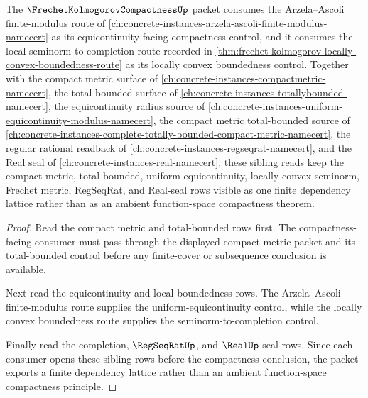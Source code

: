 \begin{theorem}
\label{thm:frechet-kolmogorov-compactness-sibling-route}
The $\FrechetKolmogorovCompactnessUp$ packet consumes the Arzela--Ascoli finite-modulus route of \autoref{ch:concrete-instances-arzela-ascoli-finite-modulus-namecert} as its equicontinuity-facing compactness control, and it consumes the local seminorm-to-completion route recorded in \autoref{thm:frechet-kolmogorov-locally-convex-boundedness-route} as its locally convex boundedness control. Together with the compact metric surface of \autoref{ch:concrete-instances-compactmetric-namecert}, the total-bounded surface of \autoref{ch:concrete-instances-totallybounded-namecert}, the equicontinuity radius source of \autoref{ch:concrete-instances-uniform-equicontinuity-modulus-namecert}, the compact metric total-bounded source of \autoref{ch:concrete-instances-complete-totally-bounded-compact-metric-namecert}, the regular rational readback of \autoref{ch:concrete-instances-regseqrat-namecert}, and the Real seal of \autoref{ch:concrete-instances-real-namecert}, these sibling reads keep the compact metric, total-bounded, uniform-equicontinuity, locally convex seminorm, Frechet metric, RegSeqRat, and Real-seal rows visible as one finite dependency lattice rather than as an ambient function-space compactness theorem.
\end{theorem}
\begin{proof}
Read the compact metric and total-bounded rows first. The compactness-facing consumer must pass through the displayed compact metric packet and its total-bounded control before any finite-cover or subsequence conclusion is available.

Next read the equicontinuity and local boundedness rows. The Arzela--Ascoli finite-modulus route supplies the uniform-equicontinuity control, while the locally convex boundedness route supplies the seminorm-to-completion control.

Finally read the completion, $\RegSeqRatUp$, and $\RealUp$ seal rows. Since each consumer opens these sibling rows before the compactness conclusion, the packet exports a finite dependency lattice rather than an ambient function-space compactness principle.
\end{proof}

